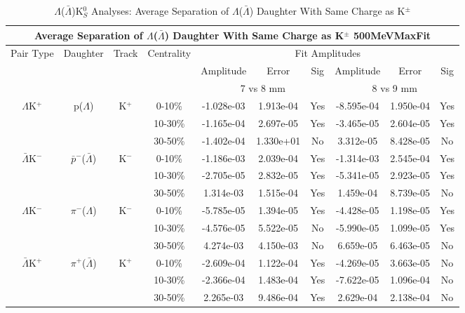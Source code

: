 \documentclass[../AnalysisNoteJBuxton.tex]{subfiles}
\begin{document}
\begin{table}
 \centering
 \begin{tabular}{|c|c|c|c|c|c|c||c|c|c|}
  \multicolumn{10}{c}{Average Separation of $\Lambda$($\bar{\Lambda}$) Daughter With Same Charge as K$^{\pm}$ 500MeVMaxFit} \\
  \hline
  \multirow{3}{*}{Pair Type} & \multirow{3}{*}{Daughter} & \multirow{3}{*}{Track} & \multirow{3}{*}{Centrality} & \multicolumn{6}{c|}{Fit Amplitudes} \\
  \cline{5-10}
   & & & & Amplitude & Error & Sig & Amplitude & Error & Sig \\  
  \cline{5-10}
   & & & & \multicolumn{3}{c||}{7 vs 8 mm} & \multicolumn{3}{c|}{8 vs 9 mm} \\  
  \hline
  \multirow{3}{*}{$\Lambda$K$^{+}$} & \multirow{3}{*}{p($\Lambda$)} & \multirow{3}{*}{K$^{+}$}
   &      0-10\% & -1.028e-03 & 1.913e-04 & Yes & -8.595e-04 & 1.950e-04 & Yes \\
   & & & 10-30\% & -1.165e-04 & 2.697e-05 & Yes & -3.465e-05 & 2.604e-05 & Yes \\
   & & & 30-50\% & -1.402e-04 & 1.330e+01 & No & 3.312e-05 & 8.428e-05 & No \\
  \hline
  \multirow{3}{*}{$\bar{\Lambda}$K$^{-}$} & \multirow{3}{*}{$\bar{p}^{-}$($\bar{\Lambda}$)} & \multirow{3}{*}{K$^{-}$}
   &      0-10\% & -1.186e-03 & 2.039e-04 & Yes & -1.314e-03 & 2.545e-04 & Yes \\
   & & & 10-30\% & -2.705e-05 & 2.832e-05 & Yes & -5.341e-05 & 2.923e-05 & Yes \\
   & & & 30-50\% & 1.314e-03 & 1.515e-04 & Yes & 1.459e-04 & 8.739e-05 & No \\
  \hline \hline
  \multirow{3}{*}{$\Lambda$K$^{-}$} & \multirow{3}{*}{$\pi^{-}$($\Lambda$)} & \multirow{3}{*}{K$^{-}$}
   &      0-10\% & -5.785e-05 & 1.394e-05 & Yes & -4.428e-05 & 1.198e-05 & Yes \\
   & & & 10-30\% & -4.576e-05 & 5.522e-05 & No & -5.990e-05 & 1.099e-05 & Yes \\
   & & & 30-50\% & 4.274e-03 & 4.150e-03 & No & 6.659e-05 & 6.463e-05 & No \\
  \hline
  \multirow{3}{*}{$\bar{\Lambda}$K$^{+}$} & \multirow{3}{*}{$\pi^{+}$($\bar{\Lambda}$)} & \multirow{3}{*}{K$^{+}$}
   &      0-10\% & -2.609e-04 & 1.122e-04 & Yes & -4.269e-05 & 3.663e-05 & No \\
   & & & 10-30\% & -2.366e-04 & 1.483e-04 & Yes & -7.622e-05 & 1.096e-04 & No \\
   & & & 30-50\% & 2.265e-03 & 9.486e-04 & Yes & 2.629e-04 & 2.138e-04 & No \\
  \hline
 \end{tabular}
 \caption{$\Lambda$($\bar{\Lambda}$)K$^{0}_{S}$ Analyses: Average Separation of $\Lambda$($\bar{\Lambda}$) Daughter With Same Charge as K$^{\pm}$}
 \label{tab:AvgSepLamKch_500MeVMaxFit}
\end{table}
\end{document}
